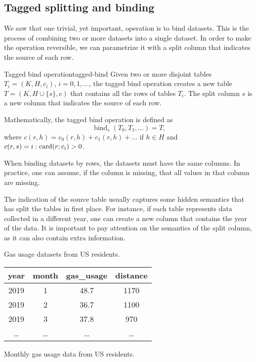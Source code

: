 \subsection{Tagged splitting and binding}

We saw that one trivial, yet important, operation is to bind datasets.  This is the
process of combining two or more datasets into a single dataset.  In order to make the
operation reversible, we can parametrize it with a split column that indicates the source
of each row.

\begin{defbox}{Tagged bind operation}{tagged-bind}
  Given two or more disjoint tables $T_i = (K, H, c_i)$, $i = 0, 1, \dots$, the tagged
  bind operation creates a new table $T = (K, H \cup \{s\}, c)$ that contains all the rows
  of tables $T_i$.  The split column $s$ is a new column that indicates the source of each
  row.

  Mathematically, the tagged bind operation is defined as \[
    \operatorname{bind}_{s}(T_0, T_1, \dots) = T\text{,}
  \] where $c(r, h) = c_0(r, h) + c_1(r, h) + \dots$ if $h \in H$ and $c(r, s) = i :
  \rowcard[r; c_i] > 0$.
\end{defbox}

When binding datasets by rows, the datasets must have the same columns.  In practice,
one can assume, if the column is missing, that all values in that column are missing.

The indication of the source table usually captures some hidden semantics that has split
the tables in first place. For instance, if each table represents data collected in a
different year, one can create a new column  that contains the year of the
data.  It is important to pay attention on the semantics of the split column, as it can
also contain extra information.

\begin{tablebox}[label=tab:gas-usage-us]{Gas usage datasets from US residents.}
  \centering
  \begin{tabular}{cccc}
    \toprule
    \textbf{year} & \textbf{month} & \textbf{gas\_usage} & \textbf{distance} \\
    \midrule
    2019 & 1 & 48.7 & 1170 \\
    2019 & 2 & 36.7 & 1100 \\
    2019 & 3 & 37.8 & 970 \\
    \dots & \dots & \dots & \dots \\
    \bottomrule
  \end{tabular}
  \tcblower
  Monthly gas usage data from US residents.
\end{tablebox}


